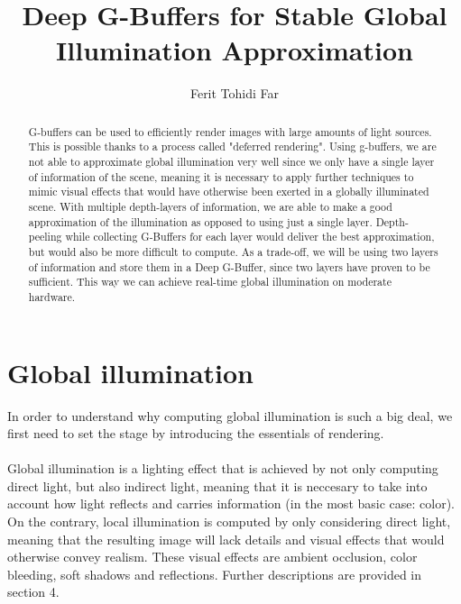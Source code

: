 \documentclass{ACGSeminar}
\begin{document}
\title{Deep G-Buffers for Stable Global Illumination Approximation}

\author{Ferit Tohidi Far}

\maketitle


\begin{abstract}%
G-buffers can be used to efficiently render images with large amounts of light sources. This is possible thanks to a process called "deferred rendering". Using g-buffers, we are not able to approximate global illumination very well since we only have a single layer of information of the scene, meaning it is necessary to apply further techniques to mimic visual effects that would have otherwise been exerted in a globally illuminated scene. With multiple depth-layers of information, we are able to make a good approximation of the illumination as opposed to using just a single layer. Depth-peeling while collecting G-Buffers for each layer would deliver the best approximation, but would also be more difficult to compute. As a trade-off, we will be using two layers of information and store them in a Deep G-Buffer, since two layers have proven to be sufficient. This way we can achieve real-time global illumination on moderate hardware.
\end{abstract}

\tableofcontents

\label{cha:references}

\newpage

\label{cha:introduction}
\section{Global illumination}
	In order to understand why computing global illumination is such a big deal, we first need to set the stage by introducing the essentials of rendering. \\\\
	Global illumination is a lighting effect that is achieved by not only computing direct light, but also indirect light, meaning that it is neccesary to take	into account how light reflects and carries information (in the most basic case: color). On the contrary, local illumination is computed by only considering direct light, meaning that the resulting image will lack details and visual effects that would otherwise convey realism. These visual effects are ambient occlusion, color bleeding, soft shadows and reflections. Further descriptions are provided in section 4.
\end{document}
